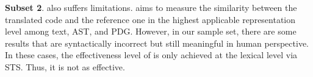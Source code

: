 \textbf{Subset 2}.
{\model} also suffers limitations.  {\model} aims to measure the
similarity between the translated code and the reference one in the
highest applicable representation level among text, AST, and
PDG. However, in our sample set, there are some results that are
syntactically incorrect but still meaningful in human perspective. In
these cases, the effectiveness level of {\model} is only achieved at
the lexical level via STS. Thus, it is not as effective.




